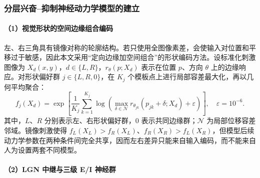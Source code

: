 \documentclass[a4paper,zihao=-4,linespread=1]{ctexart}
\numberwithin{figure}{section}       %
\begin{document}
\subsubsection{分层兴奋--抑制神经动力学模型的建立}

\paragraph{（1）视觉形状的空间边缘组合编码}

左、右三角具有镜像对称的轮廓结构。若只使用全图像素差，会使输入对位置和平移过于敏感，因此本文采用“定向边缘加空间组合”的形状编码方法。设标准化刺激图像为 $X_d(x,y)$，$d\in\{L,R\}$，$r_{\theta}(p;X_d)$ 表示在位置 $p$、方向 $\theta$ 上的边缘响应。对形状偏好群 $j\in\{L,R,0\}$，在 $K_j$ 个模板点上进行局部容差最大化，再以几何平均聚合：
\begin{equation}
f_j(X_d)=
\exp\!\left[
\frac{1}{K_j}\sum_{k=1}^{K_j}
\log\!\left(
\max_{\delta\in\mathcal N}
r_{\theta_{jk}}(p_{jk}+\delta;X_d)+\varepsilon
\right)\right],
\quad \varepsilon=10^{-6}.
\label{eq:q2_shape}
\end{equation}
其中，$L$、$R$ 分别表示左、右形状偏好群，$0$ 表示共同边缘群；$\mathcal N$ 为局部位移容差邻域。镜像刺激使得 $f_L(X_L)>f_R(X_L)$、$f_R(X_R)>f_L(X_R)$，但模型后续动力学参数在两种条件间完全共享，因而左右差异只能来自输入编码，而不能来自人为设置两套不同模型。

\paragraph{（2）LGN 中继与三级 E/I 神经群}
\end{document}
